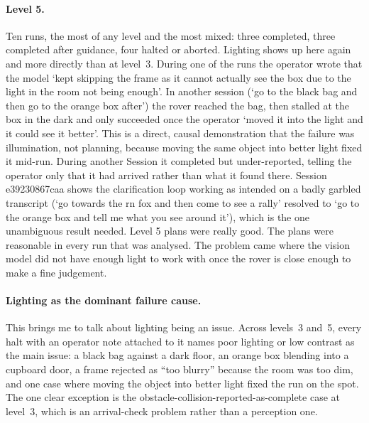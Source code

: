 \paragraph{Level 5.} Ten runs, the most of any level and the most mixed: three completed, three completed after
guidance, four halted or aborted. Lighting shows up here again and more directly than at level~3. During one
of the runs the operator wrote that the model `kept skipping the frame as it cannot actually see the box due to
the light in the room not being enough'. In another session (`go to the black bag and then go to the
orange box after') the rover reached the bag, then stalled at the box in the dark and only succeeded once the
operator `moved it into the light and it could see it better'. This is a direct, causal demonstration that the failure
was illumination, not planning, because moving the same object into better light fixed it mid-run. During another Session
it completed but under-reported, telling the operator only that it had arrived rather than
what it found there. Session e39230867caa shows the clarification loop working as intended on a badly garbled
transcript (`go towards the rn fox and then come to see a rally' resolved to `go to the orange box and tell me
what you see around it'), which is the one unambiguous result needed. Level 5 plans were really good. The plans were reasonable
in every run that was analysed. The problem came where the vision model did not have enough light to work with once the rover is close
enough to make a fine judgement.

\paragraph{Lighting as the dominant failure cause.} This brings me to talk about lighting being an issue.
Across levels~3 and~5, every halt with an operator note
attached to it names poor lighting or low contrast as the main issue: a black bag against a dark floor, an
orange box blending into a cupboard door, a frame rejected as ``too blurry'' because the room was too dim, and one
case where moving the object into better light fixed the run on the spot. The one clear exception is the
obstacle-collision-reported-as-complete case at level~3, which is an arrival-check problem rather than a perception
one. 

